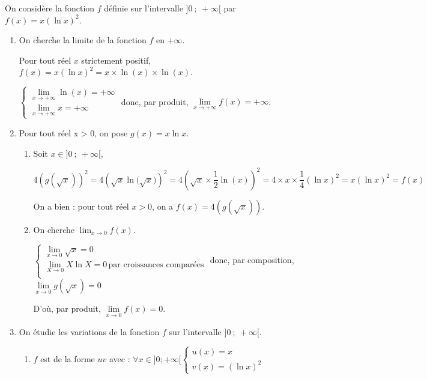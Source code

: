 On considère la fonction $f$ définie sur l'intervalle $]0~;~+\infty[$ par
$f(x) = x(\ln x)^2$.
%
%

\begin{enumerate}
	\item On cherche la limite de la fonction $f$ en $+\infty$.

	Pour tout réel $x$ strictement positif, $f(x)=x\left(\ln x\right)^2=x \times \ln(x) \times \ln(x)$. 
	
	$\begin{cases}
		\lim\limits_{x \to +\infty} \ln(x)= +\infty\\
		\lim\limits_{x\to +\infty}  x = +\infty
	\end{cases}$ donc, par produit,  $\lim\limits_{x \to +\infty} f(x)= +\infty$.
	
	\item Pour tout réel x > 0, on pose $g(x) = x\ln x$.
	\begin{enumerate}
		\item Soit $x \in ]0~;~+\infty[$, 

		$4\left(g\left(\sqrt x\right)\right) ^2= 4 \left( \sqrt{x} \ln\big(\sqrt{x}\big) \right) ^2= 4 \left( \sqrt{x} \times \dfrac{1}{2} \ln(x)\right)^2 = 4 \times x \times \dfrac{1}{4} \left( \ln x\right) ^2 = x \left( \ln x\right) ^2 =f(x)$

On a bien :  pour tout réel $x > 0$, on a $f(x) = 4\left(g\left(\sqrt x\right)\right)$.
		\item On cherche $\displaystyle\lim_{x \to 0} f(x)$.

$\begin{cases}
\lim\limits_{x \to 0} \sqrt{x} =0 \\
\lim\limits_{X \to 0} X\ln X = 0 \, \text{par croissances comparées} \\
\end{cases}$ donc, par composition, $\lim\limits_{x\to 0} g(\sqrt x)=0$

D'où, par produit, $\lim\limits_{x\to 0} f(x)=0$. 
	\end{enumerate}
\item On étudie les variations de la fonction $f$ sur l'intervalle $]0~;~+\infty[$.
	\begin{enumerate}
		\item $f$ est de la forme $uv$ avec : \quad $\forall x \in ]0;+\infty[  \begin{cases}
u(x)=x\\ v(x)=(\ln x)^2\end{cases}$


\end{enumerate}
\end{enumerate}
